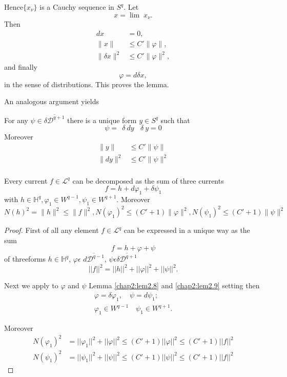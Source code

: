 Hence\pageoriginale $\{x_\nu\}$ is a Cauchy sequence in $S^q$. Let  
$$
x = \lim \; x_\nu .
$$
Then
\begin{align*}
  dx & =0 ,\\
  \parallel x \parallel & \leq C' \parallel \varphi \parallel ,\\
  \parallel \delta x \parallel^2 & \leq C' \parallel \varphi \parallel^2,
\end{align*}
and finally
$$ 
\varphi=d \delta x , 
$$
in the sense of distributions. This proves the lemma.

An analogous argument yields 

\begin{lemma}\label{chap2:lem2.9}%
  For any $\psi \in \overline {\delta \mathcal{D}^{q+1}}$ there is a
  unique form $y\in S^q$  such that 
  $$ 
  \psi =~~\delta~dy~~~~\delta~y=0 
  $$
  Moreover
  \begin{align*}
    \parallel y \parallel & \leq C' \parallel \psi \parallel\\
    \parallel dy \parallel^2 &\leq C' \parallel \psi \parallel^2\\
  \end{align*}
\end{lemma}

\begin{theorem}\label{chap2:thm2.6}%
  Every current $f \in \mathcal{L}^q $ can be decomposed as the sum of
  three currents 
  $$ 
  f = h+d \varphi_1 + \delta \psi_1 
  $$
  with $ h \in \mathbb{H}^q, \varphi_1 \in W^{q-1}, \psi_1 \in
  W^{q+1}$. Moreover 
  $$ 
  N(h)^2 = \parallel h\parallel^2 \leq \parallel f \parallel^2,
  N(\varphi_1)^2 \leq (C'+1) \parallel \varphi \parallel^2,
  N(\psi_1)^2 \leq  (C'+1) \parallel \psi \parallel^2 
  $$
\end{theorem}

\begin{proof}
  First of all any element $f \in \mathcal{L}^q$ can be expressed in a
  unique way as the sum 
  $$ 
  f=h+\varphi + \psi 
  $$
  of three\pageoriginale forms $h \in \mathbb{H}^q$, $\varphi \epsilon$
  $\overline{d \mathscr{D}^{q-1}}$, $\psi \epsilon \overline{\delta
    \mathscr{D}^{q+1}}$   
  $$
  || f||^2 = ||h||^2+|| \varphi||^2 +||\psi||^2.
  $$
  
  Next we apply to $\varphi$ and $\psi$ Lemma \ref{chap2:lem2.8}  and
  \ref{chap2:lem2.9} setting  then  
  \begin{gather*}
    \varphi = \delta \varphi_1,  \quad  \psi = d \psi_1;\\
    \varphi_1 \in W^{q-1} \quad  \psi_1 \in W^{q+1}.
  \end{gather*}
  
  Moreover
  \begin{align*}
    N(\varphi_1)^2 &=||\varphi_1||^2+||\varphi||^2\le
    (C'+1)||\varphi||^2 \le(C'+1)||f||^2 \\
    N(\psi_1)^2 & =||\psi_1||^2+||\psi||^2\le(C'+1)||\psi||^2\le (C'+1)||f||^2
  \end{align*}
\end{proof}

